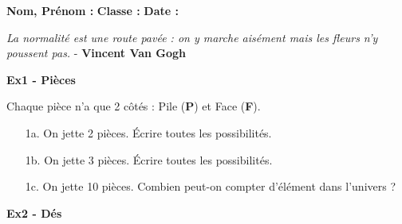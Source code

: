 



\textbf{Nom, Prénom :} \hspace{8cm} \textbf{Classe :} \hspace{3cm} \textbf{Date :}\\
\vspace{-0.8cm}
\begin{center}
  \textit{La normalité est une route pavée : on y marche aisément mais les fleurs n’y poussent pas.} - \textbf{Vincent Van Gogh}
\end{center}

\textbf{Ex1 - Pièces}

\begin{multicols}{2}\noindent 

Chaque pièce n'a que 2 côtés : Pile (\textbf{P}) et Face (\textbf{F}).

\begin{enumerate}
  \item[1a.] On jette 2 pièces. Écrire toutes les possibilités. \\ \Pointilles[2]  \columnbreak 
  \item[1b.] On jette 3 pièces. Écrire toutes les possibilités. \\ \Pointilles[4]
\end{enumerate}  \end{multicols} 
\begin{enumerate}
  \item[1c.] On jette 10 pièces. Combien peut-on compter d'élément dans l'univers ? \\ \Pointilles[4]
\end{enumerate}  

\textbf{Ex2 - Dés}

